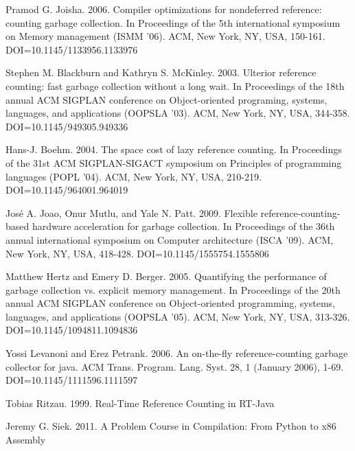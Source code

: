 \documentclass{sigplanconf}
\begin{document}




\begin{thebibliography}{}
\softraggedright
{}
Pramod G. Joisha. 2006. Compiler optimizations for nondeferred reference: counting garbage collection. In Proceedings of the 5th international symposium on Memory management (ISMM '06). ACM, New York, NY, USA, 150-161. DOI=10.1145/1133956.1133976

Stephen M. Blackburn and Kathryn S. McKinley. 2003. Ulterior reference counting: fast garbage collection without a long wait. In Proceedings of the 18th annual ACM SIGPLAN conference on Object-oriented programing, systems, languages, and applications (OOPSLA '03). ACM, New York, NY, USA, 344-358. DOI=10.1145/949305.949336

Hans-J. Boehm. 2004. The space cost of lazy reference counting. In Proceedings of the 31st ACM SIGPLAN-SIGACT symposium on Principles of programming languages (POPL '04). ACM, New York, NY, USA, 210-219. DOI=10.1145/964001.964019 

José A. Joao, Onur Mutlu, and Yale N. Patt. 2009. Flexible reference-counting-based hardware acceleration for garbage collection. In Proceedings of the 36th annual international symposium on Computer architecture (ISCA '09). ACM, New York, NY, USA, 418-428. DOI=10.1145/1555754.1555806

Matthew Hertz and Emery D. Berger. 2005. Quantifying the performance of garbage collection vs. explicit memory management. In Proceedings of the 20th annual ACM SIGPLAN conference on Object-oriented programming, systems, languages, and applications (OOPSLA '05). ACM, New York, NY, USA, 313-326. DOI=10.1145/1094811.1094836  

Yossi Levanoni and Erez Petrank. 2006. An on-the-fly reference-counting garbage collector for java. ACM Trans. Program. Lang. Syst. 28, 1 (January 2006), 1-69. DOI=10.1145/1111596.1111597 

Tobias Ritzau. 1999.  Real-Time Reference Counting in RT-Java

Jeremy G. Siek. 2011.  A Problem Course in Compilation: From Python to x86 Assembly

\end{thebibliography}
\end{document}
